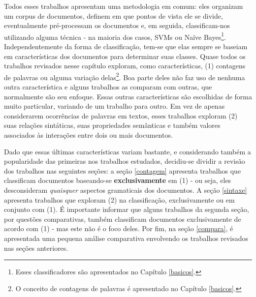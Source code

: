 Todos esses trabalhos apresentam uma metodologia em comum: eles organizam um corpus de documentos, definem em que pontos de vista ele se divide, eventualmente pré-processam os documentos e, em seguida, classificam-nos utilizando alguma técnica - na maioria dos casos, SVMs ou Naïve Bayes\footnote{Esses classificadores são apresentados no Capítulo \ref{basicos}.}. Independentemente da forma de classificação, tem-se que elas sempre se baseiam em características dos documentos para determinar suas classes. Quase todos os trabalhos revisados nesse capítulo exploram, como características, (1) contagens de palavras ou alguma variação delas\footnote{O conceito de contagens de palavras é apresentado no Capítulo \ref{basicos}.}. Boa parte deles não faz uso de nenhuma outra característica e alguns trabalhos as comparam com outras, que normalmente são seu enfoque. Essas outras características são escolhidas de forma muito particular, variando de um trabalho para outro. Em vez de apenas considerarem ocorrências de palavras em textos, esses trabalhos exploram (2) suas relações sintáticas, suas propriedades semânticas e também valores associados às interações entre dois ou mais documentos. 

Dado que essas últimas características variam bastante, e considerando também a popularidade das primeiras nos trabalhos estudados, decidiu-se dividir a revisão dos trabalhos nas seguintes seções: a seção \ref{contagem} apresenta trabalhos que classificam documentos baseando-se \textbf{exclusivamente} em (1) - ou seja, eles desconsideram \emph{quaisquer} aspectos gramaticais dos documentos. A seção \ref{sintaxe} apresenta trabalhos que exploram (2) na classificação, exclusivamente ou em conjunto com (1). É importante informar que alguns trabalhos da segunda seção, por questões comparativas, também classificam documentos exclusivamente de acordo com (1) - mas este não é o foco deles.  Por fim, na seção \ref{compara}, é apresentada uma pequena análise comparativa envolvendo os trabalhos revisados nas seções anteriores.


